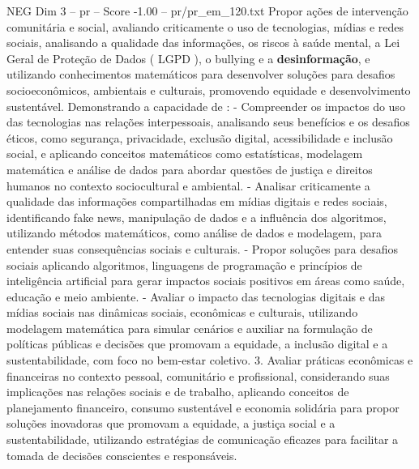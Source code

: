 \begin{textsample}{NEG Dim 3 – pr – Score -1.00 – pr/pr\_em\_120.txt}
Propor ações de intervenção comunitária e social, avaliando criticamente o uso de tecnologias, mídias e redes sociais, analisando a qualidade das informações, os riscos à saúde mental, a Lei Geral de Proteção de Dados ( LGPD ), o bullying e a \textbf{desinformação}, e utilizando conhecimentos matemáticos para desenvolver soluções para desafios socioeconômicos, ambientais e culturais, promovendo equidade e desenvolvimento sustentável.
Demonstrando a capacidade de : - Compreender os impactos do uso das tecnologias nas relações interpessoais, analisando seus benefícios e os desafios éticos, como segurança, privacidade, exclusão digital, acessibilidade e inclusão social, e aplicando conceitos matemáticos como estatísticas, modelagem matemática e análise de dados para abordar questões de justiça e direitos humanos no contexto sociocultural e ambiental. - Analisar criticamente a qualidade das informações compartilhadas em mídias digitais e redes sociais, identificando fake news, manipulação de dados e a influência dos algoritmos, utilizando métodos matemáticos, como análise de dados e modelagem, para entender suas consequências sociais e culturais. - Propor soluções para desafios sociais aplicando algoritmos, linguagens de programação e princípios de inteligência artificial para gerar impactos sociais positivos em áreas como saúde, educação e meio ambiente. - Avaliar o impacto das tecnologias digitais e das mídias sociais nas dinâmicas sociais, econômicas e culturais, utilizando modelagem matemática para simular cenários e auxiliar na formulação de políticas públicas e decisões que promovam a equidade, a inclusão digital e a sustentabilidade, com foco no bem-estar coletivo. 3.
Avaliar práticas econômicas e financeiras no contexto pessoal, comunitário e profissional, considerando suas implicações nas relações sociais e de trabalho, aplicando conceitos de planejamento financeiro, consumo sustentável e economia solidária para propor soluções inovadoras que promovam a equidade, a justiça social e a sustentabilidade, utilizando estratégias de comunicação eficazes para facilitar a tomada de decisões conscientes e responsáveis.

\end{textsample}
